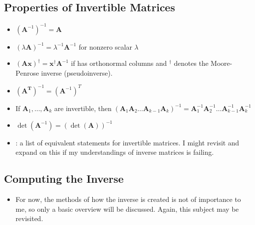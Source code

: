 \begin{itemize}
  \subsection{Properties of Invertible Matrices}\label{Properties of Invertible Matrices}
  \begin{itemize}
    \item \((\bm{A}^{-1} )^{-1} = \bm{A}\)
    \item \((\lambda \bm{A} )^{-1} = \lambda ^{-1} \bm{A} ^{-1} \) for nonzero scalar \(\lambda \)
    \item \((\bm{Ax})^{\dagger} = \bm{x}^{\dagger} \bm{A}^{-1}\) if  has orthonormal columns and \(^\dagger \) denotes the Moore-Penrose inverse (pseudoinverse).
    \item \((\bm{A^T})^{-1} = (\bm{A}^{-1})^T \)
    \item If \(\bm{A}_1,\ldots,\bm{A}_k \) are invertible, then \((\bm{A}_1\bm{A}_2\ldots \bm{A}_{k-1}\bm{A}_k)^{-1} = \bm{A}_1 ^{-1}\bm{A}_2 ^{-1}\ldots \bm{A}_{k-1}^{-1}\bm{A}_k ^{-1}\) 
    \item \(\det{(\bm{A} ^{-1})} = (\det{(\bm{A})}) ^{-1}\)
    \item {}: a list of equivalent statements for invertible matrices. I might revisit and expand on this if my understandings of inverse matrices is failing. 
  \end{itemize}

  \subsection{Computing the Inverse}\label{Computing the Inverse}
  \begin{itemize}
    \item For now, the methods of how the inverse is created is not of importance to me, so only a basic overview will be discussed. Again, this subject may be revisited.
  \end{itemize}
  
\end{itemize}